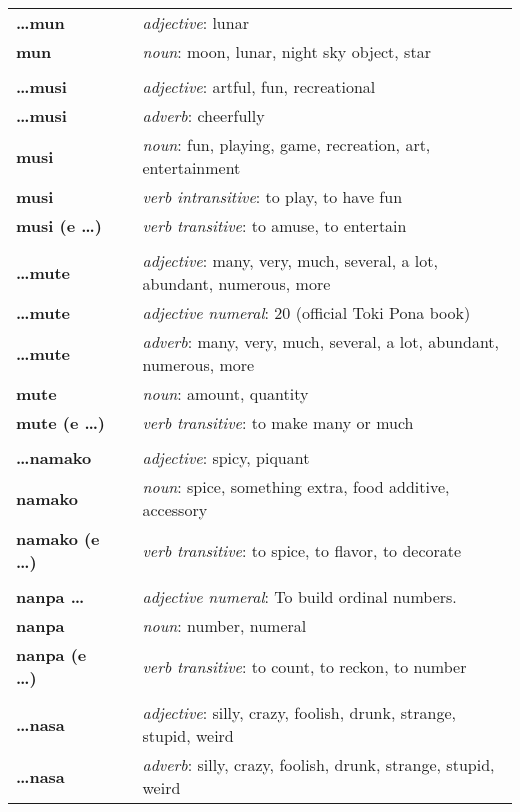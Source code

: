 \begin{supertabular}{p{2,5cm}|ll}
\textbf{\dots mun} && \textit{adjective}: lunar \\ 
\textbf{mun} && \textit{noun}: moon, lunar, night sky object, star \\ 
 && \\ %
\textbf{\dots musi} && \textit{adjective}: artful, fun, recreational \\ 
\textbf{\dots musi} && \textit{adverb}: cheerfully \\ 
\textbf{musi} && \textit{noun}: fun, playing, game, recreation, art, entertainment \\ 
\textbf{musi} && \textit{verb intransitive}: to play, to have fun \\ 
\textbf{musi (e \dots)} && \textit{verb transitive}: to amuse, to entertain \\ 
 && \\ %
\textbf{\dots mute} && \textit{adjective}: many, very, much, several, a lot, abundant, numerous, more \\ 
\textbf{\dots mute} && \textit{adjective numeral}: 20 (official Toki Pona book) \\ 
\textbf{\dots mute} && \textit{adverb}: many, very, much, several, a lot, abundant, numerous, more \\ 
\textbf{mute} && \textit{noun}: amount, quantity \\ 
\textbf{mute (e \dots)} && \textit{verb transitive}: to make many or much \\ 
 && \\ %
\textbf{\dots namako} && \textit{adjective}: spicy, piquant \\ 
\textbf{namako} && \textit{noun}: spice, something extra, food additive, accessory \\ 
\textbf{namako (e \dots)} && \textit{verb transitive}: to spice, to flavor, to decorate \\ 
 && \\ %
\textbf{nanpa \dots} && \textit{adjective numeral}: To build ordinal numbers. \\ 
\textbf{nanpa} && \textit{noun}: number, numeral \\ 
\textbf{nanpa (e \dots)} && \textit{verb transitive}: to count, to reckon,  to number \\ 
 && \\ %
\textbf{\dots nasa} && \textit{adjective}: silly, crazy, foolish, drunk, strange, stupid, weird \\ 
\textbf{\dots nasa} && \textit{adverb}: silly, crazy, foolish, drunk, strange, stupid, weird \\ 

\end{supertabular}
